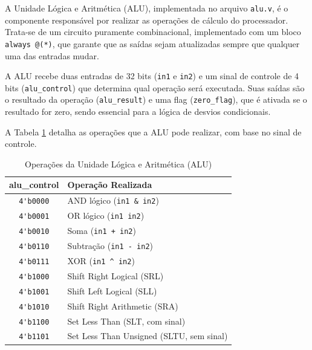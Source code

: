 \documentclass[12pt, a4paper]{article}
\begin{document}
A Unidade Lógica e Aritmética (ALU), implementada no arquivo \texttt{alu.v}, é o componente responsável por realizar as operações de cálculo do processador. Trata-se de um circuito puramente combinacional, implementado com um bloco \texttt{always @(*)}, que garante que as saídas sejam atualizadas sempre que qualquer uma das entradas mudar.

A ALU recebe duas entradas de 32 bits (\texttt{in1} e \texttt{in2}) e um sinal de controle de 4 bits (\texttt{alu\_control}) que determina qual operação será executada. Suas saídas são o resultado da operação (\texttt{alu\_result}) e uma flag (\texttt{zero\_flag}), que é ativada se o resultado for zero, sendo essencial para a lógica de desvios condicionais.

A Tabela \ref{tab:alu_ops} detalha as operações que a ALU pode realizar, com base no sinal de controle.

\begin{table}[h!]
\centering
\caption{Operações da Unidade Lógica e Aritmética (ALU)}
\label{tab:alu_ops}
\begin{tabular}{|c|l|}
\hline
\textbf{alu\_control} & \textbf{Operação Realizada} \\
\hline
\verb|4'b0000| & AND lógico (\texttt{in1 \& in2}) \\
\verb|4'b0001| & OR lógico (\texttt{in1 \textbar{} in2}) \\
\verb|4'b0010| & Soma (\texttt{in1 + in2}) \\
\verb|4'b0110| & Subtração (\texttt{in1 - in2}) \\
\verb|4'b0111| & XOR (\texttt{in1 \textasciicircum{} in2}) \\
\verb|4'b1000| & Shift Right Logical (SRL) \\
\verb|4'b1001| & Shift Left Logical (SLL) \\
\verb|4'b1010| & Shift Right Arithmetic (SRA) \\
\verb|4'b1100| & Set Less Than (SLT, com sinal) \\
\verb|4'b1101| & Set Less Than Unsigned (SLTU, sem sinal) \\
\hline
\end{tabular}
\end{table}
\end{document}

